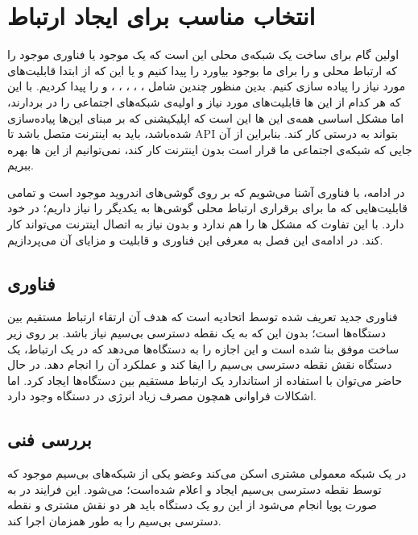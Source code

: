\chapter{انتخاب مناسب برای ایجاد ارتباط }
\thispagestyle{empty}

اولین گام برای ساخت یک شبکه‌ی محلی این است که یک 
موجود یا فناوری موجود را که ارتباط محلی و 
را برای ما بوجود بیاورد را پیدا کنیم و یا این که از ابتدا قابلیت‌های مورد نیاز را پیاده سازی کنیم. بدین منظور چندین 
شامل
،
،
،
،
،
و
را پیدا کردیم.
با این که هر کدام از این 
ها قابلیت‌های مورد نیاز و اولیه‌ی شبکه‌های اجتماعی را در بردارند، اما مشکل اساسی همه‌ی این 
ها این است که اپلیکیشنی که بر مبنای این‌ها پیاده‌سازی شده‌باشد، باید به اینترنت متصل باشد تا API بتواند به درستی کار کند. بنابراین از آن جایی که شبکه‌ی اجتماعی ما قرار است بدون اینترنت کار کند، نمی‌توانیم از این 
ها بهره ببریم.

در ادامه، با فناوری
 آشنا می‌شویم که بر روی گوشی‌های اندروید موجود است و تمامی قابلیت‌هایی که ما برای برقراری ارتباط محلی گوشی‌ها به یکدیگر را نیاز داریم؛ در خود دارد. با این تفاوت که مشکل 
ها را هم ندارد و بدون نیاز به اتصال اینترنت می‌تواند کار کند. در ادامه‌ی این فصل به معرفی این فناوری و قابلیت و مزایای آن می‌پردازیم.

\section{فناوری } 
 فناوری جدید تعریف شده توسط اتحادیه 
  است که هدف آن ارتقاء ارتباط مستقیم بین دستگاه‌ها است؛ بدون این که به یک نقطه دسترسی بی‌سیم
   نیاز باشد.
بر روی زیر ساخت موفق 
بنا شده است و این اجازه را به دستگاه‌ها می‌دهد که در یک ارتباط، یک دستگاه نقش  نقطه دسترسی بی‌سیم را ایفا کند و عملکرد آن را انجام دهد. در حال حاضر می‌توان با استفاده از استاندارد 
یک ارتباط مستقیم بین دستگاه‌ها ایجاد کرد. اما اشکالات فراوانی همچون مصرف زیاد انرژی در دستگاه وجود دارد.
 
\section{بررسی فنی}
 در یک شبکه معمولی 
مشتری
 اسکن می‌کند وعضو یکی از شبکه‌های بی‌سیم موجود که توسط نقطه دسترسی بی‌سیم ایجاد و اعلام شده‌است؛ می‌شود. این فرایند در 
به صورت پویا
انجام می‌شود از این رو یک دستگاه 
باید هر دو نقش مشتری و نقطه دسترسی بی‌سیم را به طور همزمان اجرا کند.
